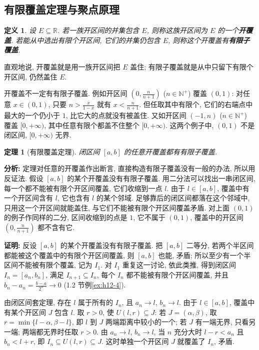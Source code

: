 \documentclass[UTF8,openany]{ctexbook}
\theoremstyle{chinesetextbook}
\newtheorem{definition}{定义}[section]
\newtheorem{theorem}{定理}[section]
\newenvironment{cnproof}{\par\indent\textbf{证明:} \ignorespaces}{\par}
\begin{document}
\subsection{有限覆盖定理与聚点原理}
\begin{definition}
设 $E\subseteq\mathbb R$. 若一族开区间的并集包含 $E$, 则称这族开区间为 $E$ 的一个\textbf{开覆盖}. 若能从中选出有限个开区间, 它们的并集仍包含 $E$, 则称这个开覆盖有\textbf{有限子覆盖}.
\end{definition}
直观地说, 开覆盖就是用一族开区间把 $E$ 盖住; 有限子覆盖就是从中只留下有限个开区间, 仍然盖住 $E$.

开覆盖不一定有有限子覆盖. 例如开区间 $\displaystyle\left(0,\frac n{n+1}\right)$ ($n\in\mathbb N^+$) 覆盖 $(0,1)$: 对任意 $x\in(0,1)$, 只要 $\displaystyle n>\frac x{1-x}$ 就有 $\displaystyle x<\frac n{n+1}$. 但任取其中有限个, 它们的右端点中最大的一个仍小于 $1$, 比它大的点就没有被盖住. 又如开区间 $(-1,n)$ ($n\in\mathbb N^+$) 覆盖 $[0,+\infty)$, 其中任意有限个都盖不住整个 $[0,+\infty)$. 这两个例子中, $(0,1)$ 不是闭区间, $[0,+\infty)$ 无界.
\begin{theorem}[有限覆盖定理]
闭区间 $[a,b]$ 的任意开覆盖都有有限子覆盖.
\end{theorem}
\par\indent\textbf{分析:} 定理对任意的开覆盖作出断言, 直接构造有限子覆盖没有一般的办法, 所以用反证法. 假设 $[a,b]$ 的某个开覆盖没有有限子覆盖. 用二分法可以找出一串闭区间, 每一个都不能被有限个开区间覆盖, 它们收缩到一点 $l$. 由于 $l\in[a,b]$, 覆盖中有一个开区间含有 $l$, 它也含有 $l$ 的某个邻域. 足够靠后的闭区间都落在这个邻域中, 只用这一个开区间就能盖住, 与它们不能被有限个开区间覆盖矛盾. 对上面 $(0,1)$ 的例子作同样的二分, 区间收缩到的点是 $1$, 它不属于 $(0,1)$, 覆盖中的开区间 $\displaystyle\left(0,\frac n{n+1}\right)$ 都不含有它.
\begin{cnproof}
反设 $[a,b]$ 的某个开覆盖没有有限子覆盖. 把 $[a,b]$ 二等分, 若两个半区间都能被这个覆盖中的有限个开区间覆盖, 则 $[a,b]$ 也能, 矛盾; 所以至少有一个半区间不能被有限个覆盖, 记为 $I_1$. 对 $I_1$ 重复这一讨论, 依此类推, 得到闭区间 $I_n=[a_n,b_n]$, 满足 $I_{n+1}\subseteq I_n$, 每个 $I_n$ 都不能被有限个开区间覆盖, 并且 $\displaystyle b_n-a_n=\frac{b-a}{2^n}\to0$ (1.2 节例\ref{ex:h12-4}).

由闭区间套定理, 存在 $l$ 属于所有的 $I_n$, 且 $a_n\to l$, $b_n\to l$. 由于 $l\in[a,b]$, 覆盖中有某个开区间 $J$ 包含 $l$. 取 $r>0$, 使 $U(l,r)\subseteq J$: 若 $J=(\alpha,\beta)$, 取 $r=\min\{l-\alpha,\beta-l\}$, 即 $l$ 到 $J$ 两端距离中较小的一个; 若 $J$ 有一端无界, 只看另一端; 两端都无界时任取 $r>0$. 由 $a_n\to l$, $b_n\to l$, 当 $n$ 充分大时 $l-r<a_n$ 且 $b_n<l+r$, 即 $I_n\subseteq U(l,r)\subseteq J$. 这时单独一个开区间 $J$ 就覆盖了 $I_n$, 矛盾.
\end{cnproof}
\end{document}
